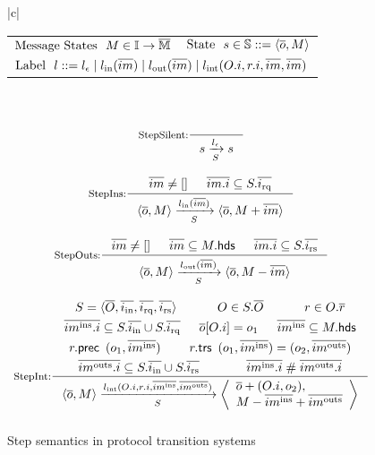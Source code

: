 \begin{figure}[t]
  \centering
  \begin{tabular}{|c|}
    \hline
     \\
    \begin{tabular}{lr}
      $\textrm{Message States}\ \ M \in \mathbb{I}{} \to \overline{\mathbb{M}}$ &
      $\textrm{State}\ \ s \in \mathbb{S}{} ::= \langle \overline{o}, M \rangle$ \\
      \multicolumn{2}{l}{$\textrm{Label}\ \ l ::= l_\epsilon{}\; |\; l_{\textrm{in}}(\overline{im})\; |\; l_{\textrm{out}}(\overline{im})\; |\; l_{\textrm{int}}(O.i, r.i, \overline{im}, \overline{im})$} \\
    \end{tabular}\\
     \\
    \begin{math}
      \begin{array}{c}
        \inference[StepSilent:]{}{\semstep{S}{s}{\lblEmpty{}}{s}}\bigskip\\
        \inference[StepIns:]{\listof{im} \neq \listnil
          & \listof{\idxOf{im}} \subseteq \hsysRqA{S}}{\semstep{S}
          {\hst{\listof{o}}{M}}
          {\lblIns{\listof{im}}}
          {\hst{\listof{o}}{\enqMsgs{M}{\listof{im}}}}}\bigskip \\
        \inference[StepOuts:]{\listof{im} \neq \listnil
          & \listof{im} \subseteq \heads{M}
          & \listof{\idxOf{im}} \subseteq \hsysRsA{S}}{\semstep{S}
          {\hst{\listof{o}}{M}}
          {\lblOuts{\listof{im}}}
          {\hst{\listof{o}}{\deqMsgs{M}{\listof{im}}}}}\bigskip \\
        \inference[StepInt:]{S = \hsyss{\listof{O}}{i}
          & O \in S.\listof{O}
          & r \in O.\listof{r}\smallskip \\
          \midxIns{im} \subseteq \hsysInA{S} \cup \hsysRqA{S}
          & \listof{o}[\idxOf{O}] = o_1
          & \msgIns{im} \subseteq \heads{M}\smallskip \\
          \rprecOf{r}\enspace (o_1, \msgIns{im})
          & \rtrsOf{r}\enspace (o_1, \msgIns{im}) = (o_2, \msgOuts{im})\smallskip \\
          \midxOuts{im} \subseteq \hsysInA{S} \cup \hsysRsA{S}
          & \disj{\midxIns{im}}{\midxOuts{im}}}{\semstep{S}
          {\hst{\listof{o}}{M}}
          {\lblInt{\idxOf{O}}{\idxOf{r}}{\msgIns{im}}{\msgOuts{im}}}
          {\hstm{\mapupd{\listof{o}}{\idxOf{O}}{o_2}}{\enqMsgs{\deqMsgs{M}{\msgIns{im}}}{\msgOuts{im}}}}}\medskip \\
      \end{array}
    \end{math}\\
    \hline
  \end{tabular}
  \caption{Step semantics in protocol transition systems}
  \label{fig-trs-semantics-steps}
\end{figure}

